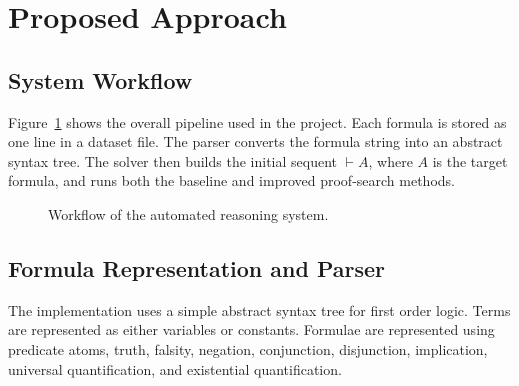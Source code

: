 \documentclass[runningheads]{llncs}
\begin{document}
\section{Proposed Approach}

\subsection{System Workflow}

Figure~\ref{fig:workflow} shows the overall pipeline used in the project. Each formula is stored as one line in a dataset file. The parser converts the formula string into an abstract syntax tree. The solver then builds the initial sequent $\vdash A$, where $A$ is the target formula, and runs both the baseline and improved proof-search methods.

\begin{figure}[t]
\centering
{}
\caption{Workflow of the automated reasoning system.}
\label{fig:workflow}
\end{figure}

\subsection{Formula Representation and Parser}

The implementation uses a simple abstract syntax tree for first order logic. Terms are represented as either variables or constants. Formulae are represented using predicate atoms, truth, falsity, negation, conjunction, disjunction, implication, universal quantification, and existential quantification.
\end{document}
